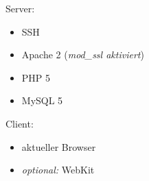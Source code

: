 Server:
\begin{itemize}
    \item SSH
	\item Apache 2 (\textit{mod\_ssl aktiviert})
	\item PHP 5
	\item MySQL 5
\end{itemize}
Client: 
\begin{itemize}
	\item aktueller Browser
    \item \textit{optional:} WebKit
\end{itemize}